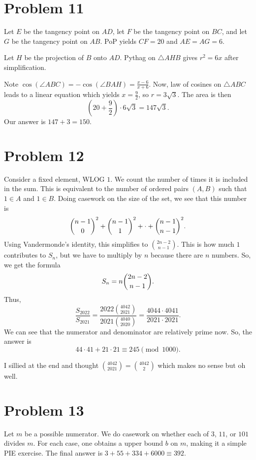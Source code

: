 \documentclass{scrartcl}
\begin{document}
\section*{Problem 11}
Let $E$ be the tangency point on $AD$,
let $F$ be the tangency point on $BC$,
and let $G$ be the tangency point on $AB$.
PoP yields $CF = 20$ and $AE = AG = 6$.

Let $H$ be the projection of $B$ onto $AD$.
Pythag on $\triangle AHB$ gives $r^2 = 6x$ after simplification.

Note $\cos(\angle ABC) = -\cos(\angle BAH) = \frac{x-6}{x+6}$.
Now, law of cosines on $\triangle ABC$ leads to a linear equation which yields $x = \frac92$,
so $r = 3\sqrt 3$.
The area is then
\[ (20 + \frac92) \cdot 6\sqrt3 = 147 \sqrt{3}. \]
Our answer is $147 + 3 = \boxed{150}$.

\section*{Problem 12}
Consider a fixed element, WLOG $1$.
We count the number of times it is included in the sum.
This is equivalent to the number of ordered pairs $(A,B)$
such that $1 \in A$ and $1 \in B$.
Doing casework on the size of the set,
we see that this number is
\[ \dbinom{n-1}{0}^2 + \dbinom{n-1}{1}^2 + \cdot + \dbinom{n-1}{n-1}^2. \]
Using Vandermonde's identity, this simplifies to $\binom{2n-2}{n-1}$.
This is how much $1$ contributes to $S_n$, but we have to multiply by $n$
because there are $n$ numbers.
So, we get the formula
\[ S_n = n \dbinom{2n-2}{n-1}. \]
Thus,
\[ \frac{S_{2022}}{S_{2021}} = \frac{2022\binom{4042}{2021}}{2021\binom{4040}{2020}} = \frac{4044 \cdot 4041}{2021 \cdot 2021}. \]
We can see that the numerator and denominator are relatively prime now.
So, the answer is
\[ 44 \cdot 41 + 21 \cdot 21 \equiv \boxed{245} \pmod{1000}. \]

\begin{remark*}
I sillied at the end and thought $\binom{4042}{2021} = \binom{4042}{2}$ which makes no sense but oh well.
\end{remark*}

\section*{Problem 13}
Let $m$ be a possible numerator.
We do casework on whether each of $3$, $11$, or $101$ divides $m$.
For each case,
one obtains a upper bound $b$ on $m$, making it a simple PIE exercise.
The final answer is $3+55+334+6000 \equiv \boxed{392}$.
\end{document}
